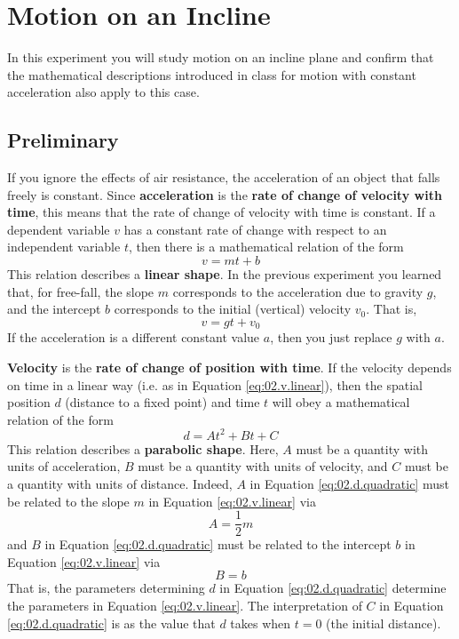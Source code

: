 \chapter{Motion on an Incline}
%
In this experiment you will study motion on an incline plane and confirm that the mathematical descriptions introduced in class for motion with constant acceleration also apply to this case.
%
\section{Preliminary}
%
If you ignore the effects of air resistance, the acceleration of an object that falls freely is constant. Since \textbf{acceleration} is the \textbf{rate of change of velocity with time}, this means that the rate of change of velocity with time is constant. If a dependent variable $v$ has a constant rate of change with respect to an independent variable $t$, then there is a mathematical relation of the form
\begin{equation}
    v = m t + b
    \label{eq:02.v.linear}
\end{equation}
This relation describes a \textbf{linear shape}. In the previous experiment you learned that, for free-fall, the slope $m$ corresponds to the acceleration due to gravity $g$, and the intercept $b$ corresponds to the initial (vertical) velocity $v_{0}$. That is,
\begin{equation}
    v = g t + v_{0}
\end{equation}
If the acceleration is a different constant value $a$, then you just replace $g$ with $a$.

\textbf{Velocity} is the \textbf{rate of change of position with time}. If the velocity depends on time in a linear way (i.e. as in Equation \ref{eq:02.v.linear}), then the spatial position $d$ (distance to a fixed point) and time $t$ will obey a mathematical relation of the form
\begin{equation}
    d = A t^{2} + B t + C
    \label{eq:02.d.quadratic}
\end{equation}
This relation describes a \textbf{parabolic shape}. Here, $A$ must be a quantity with units of acceleration, $B$ must be a quantity with units of velocity, and $C$ must be a quantity with units of distance. Indeed, $A$ in Equation \ref{eq:02.d.quadratic} must be related to the slope $m$ in Equation \ref{eq:02.v.linear} via
\begin{equation}
    A = \frac{1}{2} m
\end{equation}
and $B$ in Equation \ref{eq:02.d.quadratic} must be related to the intercept $b$ in Equation \ref{eq:02.v.linear} via
\begin{equation}
    B = b
\end{equation}
That is, the parameters determining $d$ in Equation \ref{eq:02.d.quadratic} determine the parameters in Equation \ref{eq:02.v.linear}. The interpretation of $C$ in Equation \ref{eq:02.d.quadratic} is as the value that $d$ takes when $t = 0$ (the initial distance).

